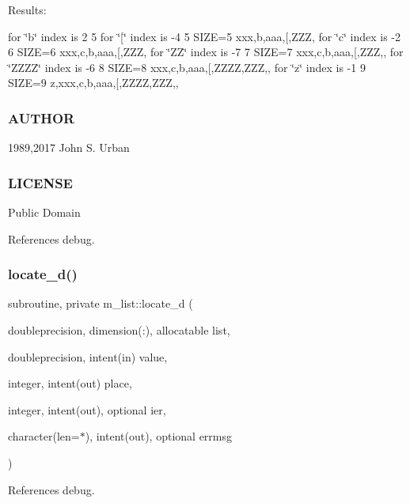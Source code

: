 Results\+:

for \char`\"{}b\char`\"{} index is 2 5 for \char`\"{}\mbox{[}\char`\"{} index is -\/4 5 S\+I\+ZE=5 xxx,b,aaa,\mbox{[},Z\+ZZ, for \char`\"{}c\char`\"{} index is -\/2 6 S\+I\+ZE=6 xxx,c,b,aaa,\mbox{[},Z\+ZZ, for \char`\"{}\+Z\+Z\char`\"{} index is -\/7 7 S\+I\+ZE=7 xxx,c,b,aaa,\mbox{[},Z\+ZZ,, for \char`\"{}\+Z\+Z\+Z\+Z\char`\"{} index is -\/6 8 S\+I\+ZE=8 xxx,c,b,aaa,\mbox{[},Z\+Z\+ZZ,Z\+ZZ,, for \char`\"{}z\char`\"{} index is -\/1 9 S\+I\+ZE=9 z,xxx,c,b,aaa,\mbox{[},Z\+Z\+ZZ,Z\+ZZ,,

\subsubsection*{A\+U\+T\+H\+OR}

1989,2017 John S. Urban \subsubsection*{L\+I\+C\+E\+N\+SE}

Public Domain 

References debug.

\mbox{\label{namespacem__list_a6b746f0ad79a6fbfbafcf0ee22e38891}} 
\subsubsection{\texorpdfstring{locate\+\_\+d()}{locate\_d()}}
{\footnotesize\ttfamily subroutine, private m\+\_\+list\+::locate\+\_\+d (\begin{DoxyParamCaption}\item[{doubleprecision, dimension(\+:), allocatable}]{list,  }\item[{doubleprecision, intent(in)}]{value,  }\item[{integer, intent(out)}]{place,  }\item[{integer, intent(out), optional}]{ier,  }\item[{character(len=$\ast$), intent(out), optional}]{errmsg }\end{DoxyParamCaption})\hspace{0.3cm}{\ttfamily [private]}}



References debug.

\mbox{\label{namespacem__list_a5b1b93df5003d6dce72acba89e779638}} 
